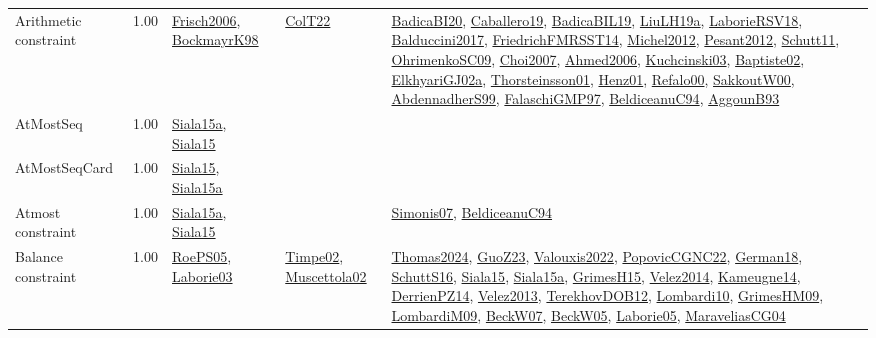 {\begin{longtable}{p{3cm}r>{\raggedright\arraybackslash}p{6cm}>{\raggedright\arraybackslash}p{6cm}>{\raggedright\arraybackslash}p{8cm}}
\index{Arithmetic constraint}\index{Constraints!Arithmetic constraint}Arithmetic constraint &  1.00 & \hyperref[detail:Frisch2006]{Frisch2006}, \hyperref[detail:BockmayrK98]{BockmayrK98} & \hyperref[detail:ColT22]{ColT22} & \hyperref[detail:BadicaBI20]{BadicaBI20}, \hyperref[detail:Caballero19]{Caballero19}, \hyperref[detail:BadicaBIL19]{BadicaBIL19}, \hyperref[detail:LiuLH19a]{LiuLH19a}, \hyperref[detail:LaborieRSV18]{LaborieRSV18}, \hyperref[detail:Balduccini2017]{Balduccini2017}, \hyperref[detail:FriedrichFMRSST14]{FriedrichFMRSST14}, \hyperref[detail:Michel2012]{Michel2012}, \hyperref[detail:Pesant2012]{Pesant2012}, \hyperref[detail:Schutt11]{Schutt11}, \hyperref[detail:OhrimenkoSC09]{OhrimenkoSC09}, \hyperref[detail:Choi2007]{Choi2007}, \hyperref[detail:Ahmed2006]{Ahmed2006}, \hyperref[detail:Kuchcinski03]{Kuchcinski03}, \hyperref[detail:Baptiste02]{Baptiste02}, \hyperref[detail:ElkhyariGJ02a]{ElkhyariGJ02a}, \hyperref[detail:Thorsteinsson01]{Thorsteinsson01}, \hyperref[detail:Henz01]{Henz01}, \hyperref[detail:Refalo00]{Refalo00}, \hyperref[detail:SakkoutW00]{SakkoutW00}, \hyperref[detail:AbdennadherS99]{AbdennadherS99}, \hyperref[detail:FalaschiGMP97]{FalaschiGMP97}, \hyperref[detail:BeldiceanuC94]{BeldiceanuC94}, \hyperref[detail:AggounB93]{AggounB93}\\
\index{AtMostSeq}\index{Constraints!AtMostSeq}AtMostSeq &  1.00 & \hyperref[detail:Siala15a]{Siala15a}, \hyperref[detail:Siala15]{Siala15} &  & \\
\index{AtMostSeqCard}\index{Constraints!AtMostSeqCard}AtMostSeqCard &  1.00 & \hyperref[detail:Siala15]{Siala15}, \hyperref[detail:Siala15a]{Siala15a} &  & \\
\index{Atmost constraint}\index{Constraints!Atmost constraint}Atmost constraint &  1.00 & \hyperref[detail:Siala15a]{Siala15a}, \hyperref[detail:Siala15]{Siala15} &  & \hyperref[detail:Simonis07]{Simonis07}, \hyperref[detail:BeldiceanuC94]{BeldiceanuC94}\\
\index{Balance constraint}\index{Constraints!Balance constraint}Balance constraint &  1.00 & \hyperref[detail:RoePS05]{RoePS05}, \hyperref[detail:Laborie03]{Laborie03} & \hyperref[detail:Timpe02]{Timpe02}, \hyperref[detail:Muscettola02]{Muscettola02} & \hyperref[detail:Thomas2024]{Thomas2024}, \hyperref[detail:GuoZ23]{GuoZ23}, \hyperref[detail:Valouxis2022]{Valouxis2022}, \hyperref[detail:PopovicCGNC22]{PopovicCGNC22}, \hyperref[detail:German18]{German18}, \hyperref[detail:SchuttS16]{SchuttS16}, \hyperref[detail:Siala15]{Siala15}, \hyperref[detail:Siala15a]{Siala15a}, \hyperref[detail:GrimesH15]{GrimesH15}, \hyperref[detail:Velez2014]{Velez2014}, \hyperref[detail:Kameugne14]{Kameugne14}, \hyperref[detail:DerrienPZ14]{DerrienPZ14}, \hyperref[detail:Velez2013]{Velez2013}, \hyperref[detail:TerekhovDOB12]{TerekhovDOB12}, \hyperref[detail:Lombardi10]{Lombardi10}, \hyperref[detail:GrimesHM09]{GrimesHM09}, \hyperref[detail:LombardiM09]{LombardiM09}, \hyperref[detail:BeckW07]{BeckW07}, \hyperref[detail:BeckW05]{BeckW05}, \hyperref[detail:Laborie05]{Laborie05}, \hyperref[detail:MaraveliasCG04]{MaraveliasCG04}\\

\end{longtable}}
